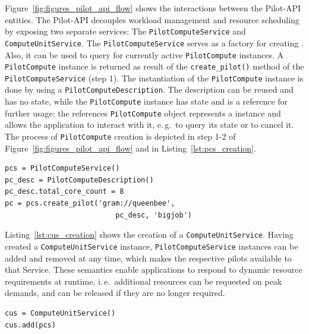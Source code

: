 \documentclass[conference]{IEEEtran}
\begin{document}
Figure~\ref{fig:figures_pilot_api_flow} shows the interactions between the
Pilot-API entities. The Pilot-API decouples
workload management and resource scheduling by exposing two separate services: 
The \texttt{Pilot\-Compute\-Service} and
\texttt{Compute\-Unit\-Service}. 
The \texttt{Pilot\-Compute\-Service} serves as a factory for creating \pilots. 
Also, it can be used to query for currently
active \texttt{Pilot\-Compute} instan\-ces.
A \texttt{Pilot\-Compute} instance is returned as result of the
\texttt{create\_pilot()} method of the \texttt{Pi\-lot\-Compute\-Service} (step 1).
The instantiation of the
\texttt{Pilot\-Compute} instance is done by using a
\texttt{Pilot\-ComputeDescription}. The description can be reused and has no
state, while the \texttt{Pilot\-Compute} instance has state and is a reference
for further usage:
the references \texttt{Pilot\-Compute} object represents a \pilot instance and allows the 
application to interact with it, e.\,g.\ to query its state or to cancel 
it. The process of \texttt{Pilot\-Compute} creation is depicted in step 1-2 of 
Figure~\ref{fig:figures_pilot_api_flow} and in Listing~\ref{lst:pcs_creation}.\\


\lstset{
language=Python,
frame=single,
captionpos=b,
stringstyle=\ttfamily,
basicstyle=\scriptsize\ttfamily
}

\begin{minipage}{0.45 \textwidth}
\begin{lstlisting}[caption={\I{Creation of a \T{PilotCompute} instance using a \T{Pi\-lot\-Compute\-Description}.}}, label={lst:pcs_creation}]
pcs = PilotComputeService()
pc_desc = PilotComputeDescription()
pc_desc.total_core_count = 8
pc = pcs.create_pilot('gram://queenbee', 
                          pc_desc, 'bigjob')
\end{lstlisting}
\end{minipage}

Listing~\ref{lst:cus_creation} shows the creation of
a \texttt{Compute\-Unit\-Service}.  Having created
a \texttt{Compute\-Unit\-Service} instance, \texttt{Pilot\-Compute\-Service}
instances can be added and removed at any time, which makes the respective pilots available to that Service.  These semantics enable applications to
respond to dynamic resource requirements at runtime, i.\,e.\ additional
resources can be requested on peak demands, and can be released if they are no
longer required.\\

\begin{minipage}{0.45 \textwidth}
\begin{lstlisting}[caption={\I{Instantiation
of a \texttt{ComputeUnitService} using a reference to the
\texttt{PilotComputeService}.}}, label={lst:cus_creation}]
cus = ComputeUnitService()
cus.add(pcs)
\end{lstlisting}
\end{minipage}
\end{document}
